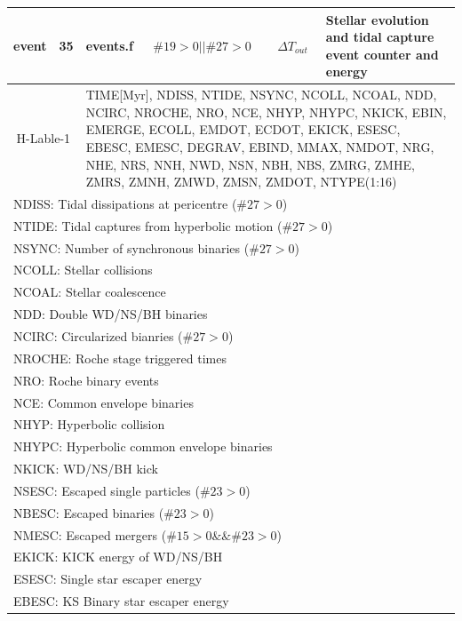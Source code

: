 \begin{longtable}{||p{0.42in}|p{0.25in}|p{0.6in}|p{0.6in}|p{0.4in}|p{2.3in}||}
  event    & 35  & events.f   & $\#19>0||\#27>0$ & $\Delta T_{out}$ & Stellar evolution and tidal capture event counter and energy \\\hline
\multicolumn{2}{|c|}{ H-Lable-1 } & \multicolumn{4}{|p{4.4in}|}{TIME[Myr], NDISS,  NTIDE,  NSYNC, NCOLL, NCOAL, NDD, NCIRC, NROCHE, NRO, NCE, NHYP, NHYPC, NKICK, EBIN, EMERGE, ECOLL, EMDOT, ECDOT, EKICK, ESESC, EBESC, EMESC, DEGRAV, EBIND, MMAX, NMDOT, NRG, NHE, NRS, NNH, NWD, NSN, NBH, NBS, ZMRG, ZMHE, ZMRS, ZMNH, ZMWD, ZMSN, ZMDOT, NTYPE(1:16)}\\\hline
\multicolumn{6}{|p{5.4in}|}{NDISS: Tidal dissipations at pericentre ($\#27>0$)}\\
\multicolumn{6}{|p{5.4in}|}{NTIDE: Tidal captures from hyperbolic motion ($\#27>0$)}\\
\multicolumn{6}{|p{5.4in}|}{NSYNC: Number of synchronous binaries ($\#27>0$)}\\
\multicolumn{6}{|p{5.4in}|}{NCOLL: Stellar collisions}\\
\multicolumn{6}{|p{5.4in}|}{NCOAL: Stellar coalescence}\\
\multicolumn{6}{|p{5.4in}|}{NDD:   Double WD/NS/BH binaries}\\
\multicolumn{6}{|p{5.4in}|}{NCIRC: Circularized bianries ($\#27>0$)}\\
\multicolumn{6}{|p{5.4in}|}{NROCHE: Roche stage triggered times}\\
\multicolumn{6}{|p{5.4in}|}{NRO:   Roche binary events}\\
\multicolumn{6}{|p{5.4in}|}{NCE:   Common envelope binaries}\\
\multicolumn{6}{|p{5.4in}|}{NHYP:  Hyperbolic collision}\\
\multicolumn{6}{|p{5.4in}|}{NHYPC: Hyperbolic common envelope binaries}\\
\multicolumn{6}{|p{5.4in}|}{NKICK: WD/NS/BH kick}\\
\multicolumn{6}{|p{5.4in}|}{NSESC: Escaped single particles ($\#23>0$)}\\
\multicolumn{6}{|p{5.4in}|}{NBESC: Escaped binaries ($\#23>0$)}\\
\multicolumn{6}{|p{5.4in}|}{NMESC: Escaped mergers ($\#15>0 \&\& \#23>0$)}\\
\multicolumn{6}{|p{5.4in}|}{EKICK: KICK energy of WD/NS/BH}\\\hline
\multicolumn{6}{|p{5.4in}|}{ESESC: Single star escaper energy}\\
\multicolumn{6}{|p{5.4in}|}{EBESC: KS Binary star escaper energy}\\

\end{longtable}
